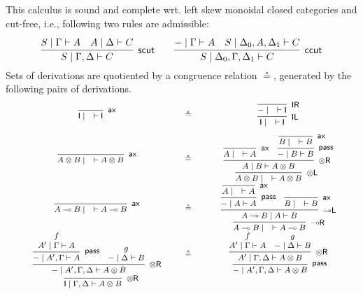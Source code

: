 \documentclass[sn-mathphys-num]{sn-jnl}%
\newcommand{\GG}{\Gamma}
\newcommand{\GD}{\Delta}
\newcommand{\vd}{\vdash}
\newcommand{\tl}{\otimes \mathsf{L}}
\newcommand{\tr}{\otimes\mathsf{R}}
\newcommand{\pass}{\mathsf{pass}}
\newcommand{\unitl}{\mathsf{IL}}
\newcommand{\unitr}{\mathsf{IR}}
\newcommand{\ax}{\mathsf{ax}}
\newcommand{\ot}{\otimes}
\newcommand{\lolli}{\multimap}
\newcommand{\lleft}{{\lolli}\mathsf{L}}
\newcommand{\lright}{{\lolli}\mathsf{R}}
\newcommand{\I}{\mathsf{I}}
\newcommand{\proofbox}[1]{\begin{tabular}{l} #1 \end{tabular}}
\theoremstyle{thmstyleone}%
\theoremstyle{thmstyletwo}%
\theoremstyle{thmstylethree}%
\begin{document}
This calculus is sound and complete wrt. left skew monoidal closed categories and cut-free, i.e., following two rules are admissible:
\begin{displaymath}
      \infer[\mathsf{scut}]{S \mid \Gamma , \Delta \vd C}{
        \deduce{S \mid \Gamma \vd A}{}
        &
        \deduce{A \mid \Delta \vd C}{}
      }
      \qquad
      \infer[\mathsf{ccut}]{S \mid \Delta_0 , \Gamma , \Delta_1 \vd C}{
        \deduce{{-} \mid \Gamma \vd A}{}
        &
        \deduce{S \mid \Delta_0 , A , \Delta_1 \vd C}{}
      }
    \end{displaymath}
Sets of derivations are quotiented by a congruence relation $\circeq$, generated by the following pairs of derivations.
\begin{displaymath}
\label{fig:circeq}
\footnotesize\begin{array}{ccc}
    \proofbox{
      \infer[\ax]{\I \mid \quad \vd \I}{}
    }
  \quad 
  &\circeq&
  \quad
  \proofbox{
     \infer[\unitl]{\I \mid \quad \vd \I}{
    \infer[\unitr]{{-} \mid \quad \vd \I}{}
   }
  }
  \\[15pt]
  \proofbox{
    \infer[\ax]{A \ot B \mid \quad \vd A \ot B}{}
  }
  \quad
  &\circeq&
  \quad
  \proofbox{
    \infer[\tl]{A \ot B \mid \quad \vd A \ot B}{
      \infer[\tr]{A \mid B \vd A \ot B}{
        \infer[\ax]{A \mid \quad \vd A}{}
        &
        \infer[\pass]{{-} \mid B \vd B}{
          \infer[\ax]{B \mid \quad \vd B}{}
        }
      }
    }
  }
  \\[15pt]
  \proofbox{
    \infer[\ax]{A \lolli B \mid \quad \vd A \lolli B}{}
  }
  \quad 
  &\circeq&
  \quad
  \proofbox{
    \infer[\lright]{A \lolli B \mid \quad \vd A \lolli B}{
      \infer[\lleft]{A \lolli B \mid A \vd B}{
        \infer[\pass]{{-} \mid A \vd A}{
          \infer[\ax]{A \mid \quad \vd A}{}
        }
        &
        \infer[\ax]{B \mid \quad \vd B}{}
      }
    }
  }
  \\[15pt]
  \proofbox{
    \infer[\tr]{{-} \mid A' , \GG , \GD \vd A \ot B}{
      \infer[\pass]{{-} \mid A' , \GG \vd A}{
        \deduce{A' \mid \GG \vd A}{f}
      }
      &
      \deduce{{-} \mid \GD \vd B}{g}
    }
  }
  \quad
  &\circeq&
  \quad
  \proofbox{
    \infer[\pass]{{-} \mid A' , \GG , \GD \vd A \ot B}{
      \infer[\tr]{A' \mid \GG , \GD \vd A \ot B}{
        \deduce{A' \mid \GG \vd A}{f}
        &
        \deduce{{-} \mid \GD \vd B}{g}
      }
    }
  }
  \\[15pt]
  \proofbox{
    \infer[\tr]{\I \mid \GG , \GD \vd A \ot B}{
}}
\end{array}
\end{displaymath}
\end{document}
